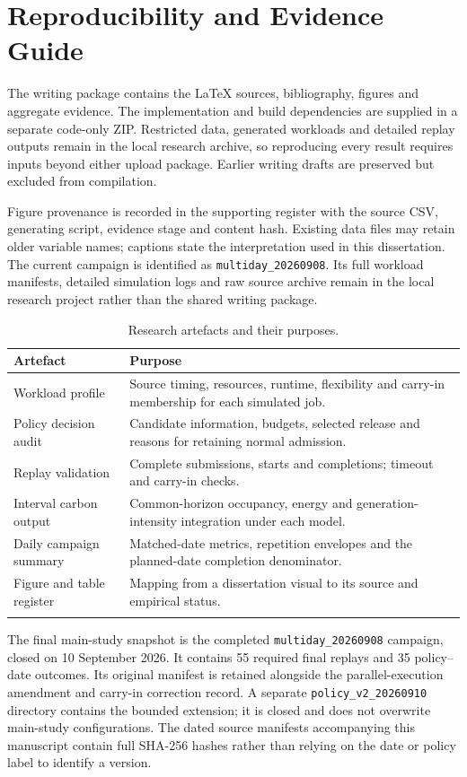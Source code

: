 \chapter{Reproducibility and Evidence Guide}
The writing package contains the LaTeX sources, bibliography, figures and aggregate evidence. The implementation and build dependencies are supplied in a separate code-only ZIP. Restricted data, generated workloads and detailed replay outputs remain in the local research archive, so reproducing every result requires inputs beyond either upload package. Earlier writing drafts are preserved but excluded from compilation.

Figure provenance is recorded in the supporting register with the source CSV, generating script, evidence stage and content hash. Existing data files may retain older variable names; captions state the interpretation used in this dissertation. The current campaign is identified as \texttt{multiday\_20260908}. Its full workload manifests, detailed simulation logs and raw source archive remain in the local research project rather than the shared writing package.

\begin{longtable}{p{}p{}}
\toprule Artefact & Purpose\\\midrule\endhead
Workload profile & Source timing, resources, runtime, flexibility and carry-in membership for each simulated job.\\
Policy decision audit & Candidate information, budgets, selected release and reasons for retaining normal admission.\\
Replay validation & Complete submissions, starts and completions; timeout and carry-in checks.\\
Interval carbon output & Common-horizon occupancy, energy and generation-intensity integration under each model.\\
Daily campaign summary & Matched-date metrics, repetition envelopes and the planned-date completion denominator.\\
Figure and table register & Mapping from a dissertation visual to its source and empirical status.\\\bottomrule
\caption{Research artefacts and their purposes.}\label{tab:research-artefacts}\\
\end{longtable}

The final main-study snapshot is the completed \texttt{multiday\_20260908} campaign, closed on 10 September 2026. It contains 55 required final replays and 35 policy--date outcomes. Its original manifest is retained alongside the parallel-execution amendment and carry-in correction record. A separate \texttt{policy\_v2\_20260910} directory contains the bounded extension; it is closed and does not overwrite main-study configurations. The dated source manifests accompanying this manuscript contain full SHA-256 hashes rather than relying on the date or policy label to identify a version.

